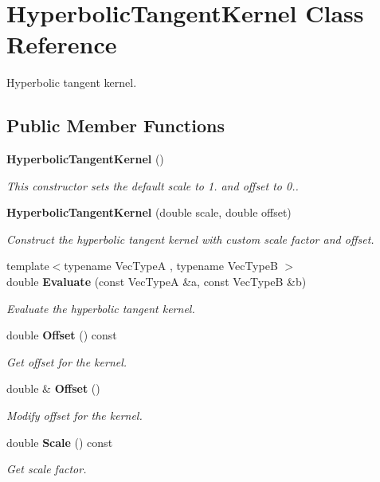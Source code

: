 \section{Hyperbolic\+Tangent\+Kernel Class Reference}
\label{classmlpack_1_1kernel_1_1HyperbolicTangentKernel}


Hyperbolic tangent kernel.  


\subsection*{Public Member Functions}
\begin{DoxyCompactItemize}
\item 
\textbf{ Hyperbolic\+Tangent\+Kernel} ()
\begin{DoxyCompactList}\small\item\em This constructor sets the default scale to 1. and offset to 0.. \end{DoxyCompactList}\item 
\textbf{ Hyperbolic\+Tangent\+Kernel} (double scale, double offset)
\begin{DoxyCompactList}\small\item\em Construct the hyperbolic tangent kernel with custom scale factor and offset. \end{DoxyCompactList}\item 
{\footnotesize template$<$typename Vec\+TypeA , typename Vec\+TypeB $>$ }\\double \textbf{ Evaluate} (const Vec\+TypeA \&a, const Vec\+TypeB \&b)
\begin{DoxyCompactList}\small\item\em Evaluate the hyperbolic tangent kernel. \end{DoxyCompactList}\item 
double \textbf{ Offset} () const
\begin{DoxyCompactList}\small\item\em Get offset for the kernel. \end{DoxyCompactList}\item 
double \& \textbf{ Offset} ()
\begin{DoxyCompactList}\small\item\em Modify offset for the kernel. \end{DoxyCompactList}\item 
double \textbf{ Scale} () const
\begin{DoxyCompactList}\small\item\em Get scale factor. \end{DoxyCompactList}\item 

\end{DoxyCompactItemize}
